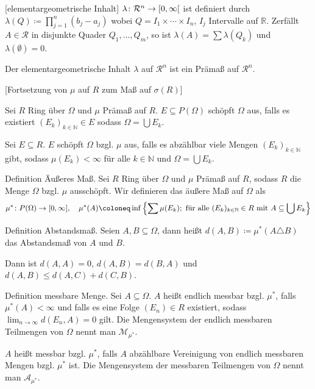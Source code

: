 \documentclass[fleqn,draft,a5paper]{article}
\theoremstyle{remark}
\begin{document}
[elementargeometrische Inhalt]  \(\lambda\colon \mathcal{R}^{n} \to \rinterval{0}{\infty}\) ist
definiert durch \(\lambda(Q) \coloneq \prod_{j=1}^{n}(b_{j} - a_{j})\) wobei \(Q = I_{1} \times
\cdots \times I_{n}\), \(I_{j}\) Intervalle auf \(\mathbb{R}\).  Zerfällt \(A \in \mathcal{R}\) in disjunkte
Quader \(Q_{1}, \ldots, Q_{m}\), so ist \(\lambda(A) = \sum \lambda(Q_{k})\) und \(\lambda(\emptyset) = 0\).

Der elementargeometrische Inhalt \(\lambda\) auf \(\mathcal{R}^{n}\) ist ein Prämaß auf \(\mathcal{R}^{n}\).

[Fortsetzung von \(\mu\) auf \(R\) zum Maß auf \(\sigma(R)\)]

Sei \(R\) Ring über \(\Omega\) und \(\mu\) Prämaß auf \(R\).  \(E \subseteq P(\Omega)\) schöpft \(\Omega\)
aus, falls es existiert \((E_{k})_{k \in \mathbb{N}} \in E\) sodass \(\Omega = \bigcup E_{k}\).

Sei \(E \subseteq R\).  \(E\) schöpft \(\Omega\) bzgl. \(\mu\) aus, falls es abzählbar viele
Mengen \((E_{k})_{k \in \mathbb{N}}\) gibt, sodass \(\mu(E_{k}) < \infty\) für alle \(k \in \mathbb{N}\)
und \(\Omega = \bigcup E_{k}\).

Definition Äußeres Maß.  Sei \(R\) Ring über \(\Omega\) und \(\mu\) Prämaß auf \(R\),
sodass \(R\) die Menge \(\Omega\) bzgl. \(\mu\) ausschöpft.  Wir definieren das
äußere Maß auf \(\Omega\) als
\[\mu^{\ast}\colon P(\Omega) \to \interval{0}{\infty}, \quad \mu^{\ast}(A) \coloneq \inf \left\{ \sum \mu(E_{k});
    \text{ für alle } (E_{k})_{k \in \mathbb{N}} \in R \text{ mit } A \subseteq \bigcup E_{k}
  \right\}\]

Definition Abstandsmaß.  Seien \(A, B \subseteq \Omega\), dann heißt \(d(A, B) \coloneq
\mu^{\ast}(A \triangle B)\) das Abstandsmaß von \(A\) und \(B\).

Dann ist \(d(A,A) = 0\), \(d(A, B) = d(B, A)\) und \(d(A, B) \le d(A, C) +
d(C, B)\).

Definition messbare Menge.  Sei \(A \subseteq \Omega\).  \(A\) heißt endlich messbar
bzgl. \(\mu^{\ast}\), falls \(\mu^{\ast} (A) < \infty\) und falls es eine Folge \((E_{n})
\in R\) existiert, sodass \(\lim_{n \to \infty} d(E_{n}, A) = 0\) gilt.  Die Mengensystem
der endlich messbaren Teilmengen von \(\Omega\) nennt man \(\mathcal{M}_{\mu^{\ast}}\).

\(A\) heißt messbar bzgl. \(\mu^{\ast}\), falls \(A\) abzählbare Vereinigung von
endlich messbaren Mengen bzgl. \(\mu^{\ast}\) ist.  Die Mengensystem der
messbaren Teilmengen von \(\Omega\) nennt man \(\mathcal{A}_{\mu^{\ast}}\).
\end{document}
